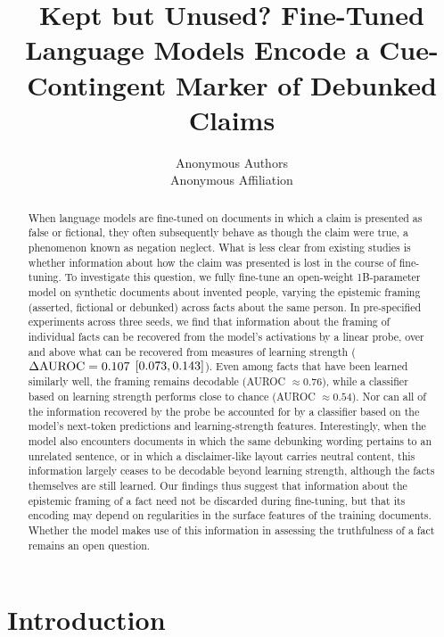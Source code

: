 \documentclass[10pt]{article}
\title{Kept but Unused? Fine-Tuned Language Models Encode a Cue-Contingent Marker of Debunked Claims}
\author{Anonymous Authors\\
Anonymous Affiliation}
\begin{document}
\maketitle

\begin{abstract}
When language models are fine-tuned on documents in which a claim is presented as false or fictional, they often subsequently behave as though the claim were true, a phenomenon known as negation neglect. What is less clear from existing studies is whether information about how the claim was presented is lost in the course of fine-tuning. To investigate this question, we fully fine-tune an open-weight 1B-parameter model on synthetic documents about invented people, varying the epistemic framing (asserted, fictional or debunked) across facts about the same person. In pre-specified experiments across three seeds, we find that information about the framing of individual facts can be recovered from the model's activations by a linear probe, over and above what can be recovered from measures of learning strength ($\Delta\mathrm{AUROC}=0.107$ $[0.073, 0.143]$). Even among facts that have been learned similarly well, the framing remains decodable (AUROC $\approx 0.76$), while a classifier based on learning strength performs close to chance (AUROC $\approx 0.54$). Nor can all of the information recovered by the probe be accounted for by a classifier based on the model's next-token predictions and learning-strength features. Interestingly, when the model also encounters documents in which the same debunking wording pertains to an unrelated sentence, or in which a disclaimer-like layout carries neutral content, this information largely ceases to be decodable beyond learning strength, although the facts themselves are still learned. Our findings thus suggest that information about the epistemic framing of a fact need not be discarded during fine-tuning, but that its encoding may depend on regularities in the surface features of the training documents. Whether the model makes use of this information in assessing the truthfulness of a fact remains an open question.
\end{abstract}

\section{Introduction}
\end{document}
